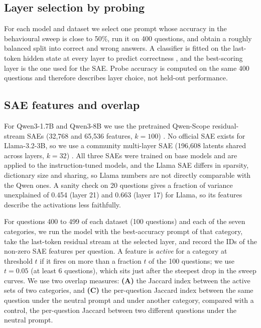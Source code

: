 \documentclass[11pt]{article}
\begin{document}
\subsection{Layer selection by probing}

For each model and dataset we select one prompt whose accuracy in the behavioural sweep is close to 50\%, run it on 400 questions, and obtain a roughly balanced split into correct and wrong answers. A classifier is fitted on the last-token hidden state at every layer to predict correctness \citep{alain2017probes}, and the best-scoring layer is the one used for the SAE. Probe accuracy is computed on the same 400 questions and therefore describes layer choice, not held-out performance.

\subsection{SAE features and overlap}

For Qwen3-1.7B and Qwen3-8B we use the pretrained Qwen-Scope residual-stream SAEs (32,768 and 65,536 features, $k{=}100$) \citep{deng2026qwenscope}. No official SAE exists for Llama-3.2-3B, so we use a community multi-layer SAE (196,608 latents shared across layers, $k{=}32$) \citep{lawson2025mlsae}. All three SAEs were trained on base models and are applied to the instruction-tuned models, and the Llama SAE differs in sparsity, dictionary size and sharing, so Llama numbers are not directly comparable with the Qwen ones. A sanity check on 20 questions gives a fraction of variance unexplained of 0.454 (layer 21) and 0.663 (layer 17) for Llama, so its features describe the activations less faithfully.

For questions 400 to 499 of each dataset (100 questions) and each of the seven categories, we run the model with the best-accuracy prompt of that category, take the last-token residual stream at the selected layer, and record the IDs of the non-zero SAE features per question. A feature is \emph{active} for a category at threshold $t$ if it fires on more than a fraction $t$ of the 100 questions; we use $t{=}0.05$ (at least 6 questions), which sits just after the steepest drop in the sweep curves. We use two overlap measures: \textbf{(A)} the Jaccard index between the active sets of two categories, and \textbf{(C)} the per-question Jaccard index between the same question under the neutral prompt and under another category, compared with a control, the per-question Jaccard between two different questions under the neutral prompt.
\end{document}
